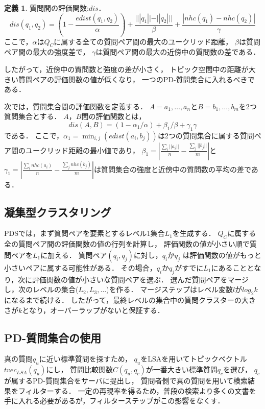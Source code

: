 \documentclass[master]{suribt}
\theoremstyle{definition}
\newtheorem{defi}[thm]{定義}
\begin{document}
 \begin{defi}{質問間の評価関数:$dis$．}
  \begin{equation}
  	dis(q_1,q_2) = (1 - \frac{edist(q_1,q_2)}{\alpha}) + \frac{|||q_1|| - ||q_2|| |}{\beta} + \frac{|nhc(q_1) -nhc(q_2)|}{\gamma}
  \end{equation}
  ここで，$\alpha$は$Q_C$に属する全ての質問ペア間の最大のユークリッド距離，
  $\beta$は質問ペア間の最大の強度差で，
  $\gamma$は質問ペア間の最大の近傍中の質問数の差である．
 \end{defi}
 
 したがって，近傍中の質問数と強度の差が小さく，
 トピック空間中の距離が大きい質問ペアの評価関数の値が低くなり，
 一つのPD-質問集合に入れるべきである．

 次では，質問集合間の評価関数を定義する．
 $A = {a_1, \dots , a_n}$と$B = {b_1 , \dots , b_m}$を2つ質問集合とする．
 $A$，$B$間の評価関数とは，
 \begin{equation}
    dis(A,B) = (1 - \alpha_1 / \alpha) + \beta_1 / \beta + \gamma_1 \gamma
 \end{equation}
 である．
 ここで，$\alpha_1 = \min_{i,j}(edist(a_i,b_j))$は2つの質問集合に属する質問ペア間のユークリッド距離の最小値であり，
 $\beta_1 = |\frac{\sum_i||a_i||}{n} - \frac{\sum_j||b_j||}{m}|$と
 $\gamma_1 = |\frac{\sum_inhc(a_i)}{n} - \frac{\sum_jnhc(b_j)}{m}|$は質問集合の強度と近傍中の質問数の平均の差である．
 
 \subsection{凝集型クラスタリング}
 PDSでは，まず質問ペアを要素とするレベル1集合$L_1$を生成する．
 $Q_C$に属する全の質問ペア間の評価関数の値の行列を計算し，
 評価関数の値が小さい順で質問ペアを$L_1$に加える．
 質問ペア$(q_i,q_j)$に対し，$q_i$か$q_j$ は評価関数の値がもっと小さいペアに属する可能性がある．
 その場合，$q_i$か$q_j$がすでに$L_1$にあることとなり，次に評価関数の値が小さいな質問ペアを選ぶ．
 選んだ質問ペアをマージし，次のレベルの集合($L_2,L_3, \dots$)を作る．
 マージステップはレベル変数$l$が$log_2k$になるまで続ける．
 したがって，最終レベルの集合中の質問クラスターの大きさが$k$となり，オーバーラップがないと保証する．

 \subsection{PD-質問集合の使用}
 真の質問$q_u$に近い標準質問を探すため，
 $q_u$をLSAを用いてトピックベクトル$tvec_{LSA}(q_u)$にし，
 質問比較関数$C(q_u,q_c)$が一番大きい標準質問$q_c$を選び，
 $q_c$が属するPD-質問集合をサーバに提出し，
 質問者側で真の質問を用いて検索結果をフィルターする．
 一定の再現率を得るため，普段の検索より多くの文書を手に入れる必要があるが，フィルターステップがこの影響をなくす．
\end{document}
